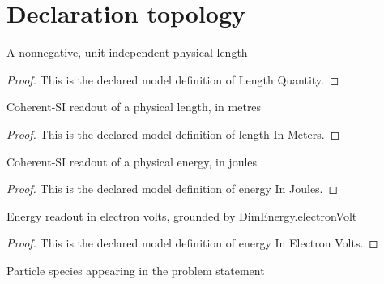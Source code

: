 \section{Declaration topology}
\begin{definition}
  \label{def:physics:phyx-mini-0657:phyxminiproblems-problemphyxmini0657-lengthquantity}
  A nonnegative, unit-independent physical length
\end{definition}
\begin{proof}
  This is the declared model definition of Length Quantity.
\end{proof}
\begin{definition}
  \label{def:physics:phyx-mini-0657:phyxminiproblems-problemphyxmini0657-lengthinmeters}
  Coherent-SI readout of a physical length, in metres
\end{definition}
\begin{proof}
  This is the declared model definition of length In Meters.
\end{proof}
\begin{definition}
  \label{def:physics:phyx-mini-0657:phyxminiproblems-problemphyxmini0657-energyinjoules}
  Coherent-SI readout of a physical energy, in joules
\end{definition}
\begin{proof}
  This is the declared model definition of energy In Joules.
\end{proof}
\begin{definition}
  \label{def:physics:phyx-mini-0657:phyxminiproblems-problemphyxmini0657-energyinelectronvolts}
  Energy readout in electron volts, grounded by DimEnergy.electronVolt
\end{definition}
\begin{proof}
  This is the declared model definition of energy In Electron Volts.
\end{proof}
\begin{definition}
  \label{def:physics:phyx-mini-0657:phyxminiproblems-problemphyxmini0657-particlespecies}
  Particle species appearing in the problem statement
\end{definition}
